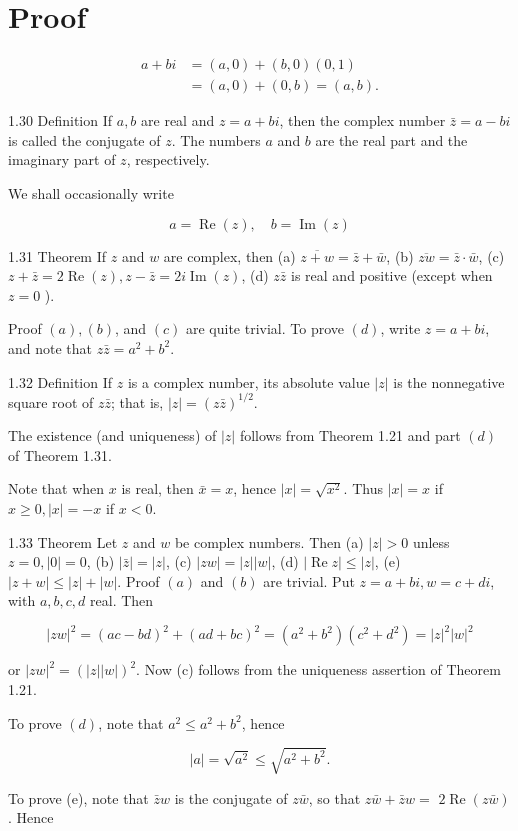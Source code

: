 \documentclass[10pt]{article}
\begin{document}
\section{Proof}
$$
\begin{aligned}
a+b i & =(a, 0)+(b, 0)(0,1) \\
& =(a, 0)+(0, b)=(a, b) .
\end{aligned}
$$

1.30 Definition If $a, b$ are real and $z=a+b i$, then the complex number $\bar{z}=a-b i$ is called the conjugate of $z$. The numbers $a$ and $b$ are the real part and the imaginary part of $z$, respectively.

We shall occasionally write

$$
a=\operatorname{Re}(z), \quad b=\operatorname{Im}(z)
$$

1.31 Theorem If $z$ and $w$ are complex, then
(a) $\overline{z+w}=\bar{z}+\bar{w}$,
(b) $\overline{z w}=\bar{z} \cdot \bar{w}$,
(c) $z+\bar{z}=2 \operatorname{Re}(z), z-\bar{z}=2 i \operatorname{Im}(z)$,
(d) $z \bar{z}$ is real and positive (except when $z=0$ ).

Proof $(a),(b)$, and $(c)$ are quite trivial. To prove $(d)$, write $z=a+b i$, and note that $z \bar{z}=a^{2}+b^{2}$.

1.32 Definition If $z$ is a complex number, its absolute value $|z|$ is the nonnegative square root of $z \bar{z}$; that is, $|z|=(z \bar{z})^{1 / 2}$.

The existence (and uniqueness) of $|z|$ follows from Theorem 1.21 and part $(d)$ of Theorem 1.31.

Note that when $x$ is real, then $\bar{x}=x$, hence $|x|=\sqrt{x^{2}}$. Thus $|x|=x$ if $x \geq 0,|x|=-x$ if $x<0$.

1.33 Theorem Let $z$ and $w$ be complex numbers. Then
(a) $|z|>0$ unless $z=0,|0|=0$,
(b) $|\bar{z}|=|z|$,
(c) $|z w|=|z||w|$,
(d) $|\operatorname{Re} z| \leq|z|$,
(e) $|z+w| \leq|z|+|w|$. Proof $(a)$ and $(b)$ are trivial. Put $z=a+b i, w=c+d i$, with $a, b, c, d$ real. Then

$$
|z w|^{2}=(a c-b d)^{2}+(a d+b c)^{2}=\left(a^{2}+b^{2}\right)\left(c^{2}+d^{2}\right)=|z|^{2}|w|^{2}
$$

or $|z w|^{2}=(|z||w|)^{2}$. Now (c) follows from the uniqueness assertion of Theorem 1.21.

To prove $(d)$, note that $a^{2} \leq a^{2}+b^{2}$, hence

$$
|a|=\sqrt{a^{2}} \leq \sqrt{a^{2}+b^{2}} .
$$

To prove (e), note that $\bar{z} w$ is the conjugate of $z \bar{w}$, so that $z \bar{w}+\bar{z} w=$ $2 \operatorname{Re}(z \bar{w})$. Hence
\end{document}
